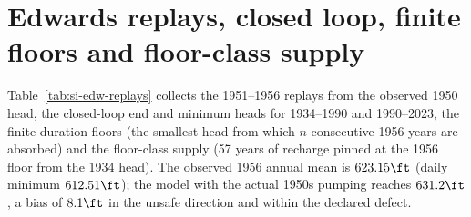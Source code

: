 \section{Edwards replays, closed loop, finite floors and floor-class supply}\label{si:edw-replays}
Table~\ref{tab:si-edw-replays} collects the 1951--1956 replays from the observed 1950 head, the closed-loop end and minimum heads for 1934--1990 and 1990--2023, the finite-duration floors (the smallest head from which $n$ consecutive 1956 years are absorbed) and the floor-class supply (57 years of recharge pinned at the 1956 floor from the 1934 head). The observed 1956 annual mean is $623.15\ft$ (daily minimum $612.51\ft$); the model with the actual 1950s pumping reaches $631.2\ft$, a bias of $8.1\ft$ in the unsafe direction and within the declared defect.

